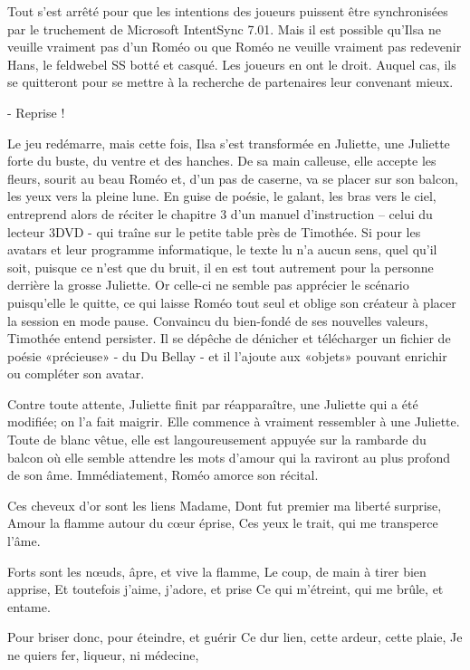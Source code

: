 Tout s’est arrêté pour que les intentions des joueurs puissent être synchronisées par le truchement de Microsoft IntentSync 7.01. Mais il est possible qu’Ilsa ne veuille vraiment pas d’un Roméo ou que Roméo ne veuille vraiment pas redevenir Hans, le feldwebel SS botté et casqué. Les joueurs en ont le droit. Auquel cas, ils se quitteront pour se mettre à la recherche de partenaires leur convenant mieux.

- Reprise !

Le jeu redémarre, mais cette fois, Ilsa s’est transformée en Juliette, une Juliette forte du buste, du ventre et des hanches. De sa main calleuse, elle accepte les fleurs, sourit au beau Roméo et, d’un pas de caserne, va se placer sur son balcon, les yeux vers la pleine lune. En guise de poésie, le galant, les bras vers le ciel, entreprend alors de réciter le chapitre 3 d’un manuel d’instruction – celui du lecteur 3DVD - qui traîne sur le petite table près de Timothée. Si pour les avatars et leur programme informatique, le texte lu n’a aucun sens, quel qu’il soit, puisque ce n’est que du bruit, il en est tout autrement pour la personne derrière la grosse Juliette. Or celle-ci ne semble pas apprécier le scénario puisqu’elle le quitte, ce qui laisse Roméo tout seul et oblige son créateur à placer la session en mode pause.
Convaincu du bien-fondé de ses nouvelles valeurs, Timothée entend persister. Il se dépêche de dénicher et télécharger un fichier de poésie «précieuse» - du Du Bellay - et il l’ajoute aux «objets» pouvant enrichir ou compléter son avatar.

Contre toute attente, Juliette finit par réapparaître, une Juliette qui a été modifiée; on l’a fait maigrir. Elle commence à vraiment ressembler à une Juliette. Toute de blanc vêtue, elle est langoureusement appuyée sur la rambarde du balcon où elle semble attendre les mots d’amour qui la raviront au plus profond de son âme. Immédiatement, Roméo amorce son récital.

    Ces cheveux d’or sont les liens Madame,
    Dont fut premier ma liberté surprise,
    Amour la flamme autour du cœur éprise,
    Ces yeux le trait, qui me transperce l’âme.

    Forts sont les nœuds, âpre, et vive la flamme,
    Le coup, de main à tirer bien apprise,
    Et toutefois j’aime, j’adore, et prise
    Ce qui m’étreint, qui me brûle, et entame.

    Pour briser donc, pour éteindre, et guérir
    Ce dur lien, cette ardeur, cette plaie,
    Je ne quiers fer, liqueur, ni médecine,


